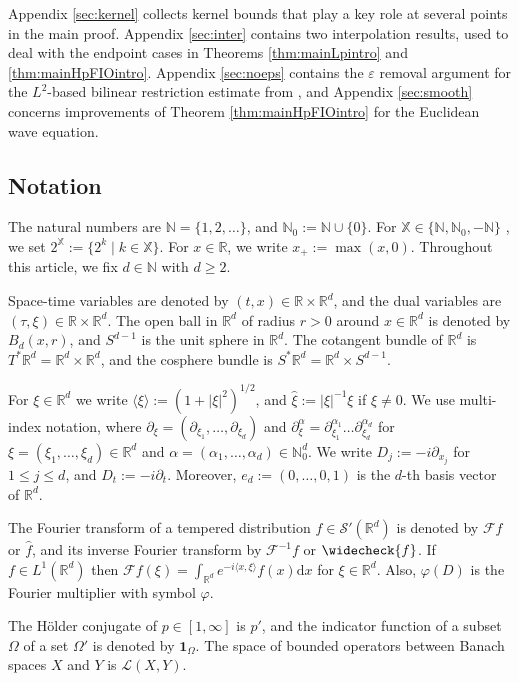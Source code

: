 \documentclass{amsart}
\numberwithin{equation}{section}
\theoremstyle{definition}
\newcommand{\R}{\mathbb{R}}
\newcommand{\Rd}{\mathbb{R}^{d}}
\newcommand{\Rn}{\mathbb{R}^{d}}
\newcommand{\N}{\mathbb{N}}
\newcommand{\Z}{\mathbb{Z}}
\newcommand{\F}{\mathcal{F}}
\newcommand {\ind}{{\mathbf{1}}}
\newcommand {\La}{\mathcal{L}}
\newcommand {\ud}{\mathrm{d}}
\newcommand {\veps}{\varepsilon}
\newcommand {\ph}{\varphi}
\newcommand {\Sp}{S^{*}\Rd}
\newcommand {\Sw}{\mathcal{S}}
\newcommand {\wh}{\widehat}
\newcommand {\rb}{\rangle}
\newcommand {\lb}{\langle}
\begin{document}
Appendix \ref{sec:kernel} collects kernel bounds that play a key role at several points in the main proof.  Appendix \ref{sec:inter} contains two interpolation results, used to deal with the endpoint cases in Theorems \ref{thm:mainLpintro} and \ref{thm:mainHpFIOintro}. Appendix \ref{sec:noeps} contains the $\veps$ removal argument for the $L^{2}$-based bilinear restriction estimate from \cite{SchippaTataru2025}, and Appendix \ref{sec:smooth} concerns improvements of Theorem \ref{thm:mainHpFIOintro} for the Euclidean wave equation.

\subsection{Notation}
The natural numbers are $\N=\{1,2,\ldots\}$, and $\N_{0}:=\N\cup\{0\}$. 
For $\mathbb{X} \in \{ \N, \N_0,-\N\}$%
, we set $2^{\mathbb{X}}:=\{2^{k}\mid k\in\mathbb{X}\}$. For $x \in \R$, we write $x_+ := \max(x,0)$. Throughout this article, we fix $d\in\N$ with $d\geq2$. 

Space-time variables are denoted by $(t,x) \in \R\times \R^d$, and the dual variables are $(\tau,\xi) \in \R\times \R^d$. The open ball in $\Rd$ of radius $r>0$ around $x\in\Rd$ is denoted by $B_{d}(x,r)$, and $S^{d-1}$ is the unit sphere in $\Rd$. The cotangent bundle of $\Rd$ is $T^{*}\Rd=\R^{d}\times\Rd$, and the cosphere bundle is $\Sp=\Rd\times S^{d-1}$.

For $\xi\in\Rd$ we write $\lb\xi\rb:=(1+|\xi|^{2})^{1/2}$, and $\hat{\xi}:=|\xi|^{-1}\xi$ if $\xi\neq 0$. We use multi-index notation, where $\partial_{\xi}=(\partial_{\xi_{1}},\ldots,\partial_{\xi_{d}})$ and 
$\partial^{\alpha}_{\xi}=\partial^{\alpha_{1}}_{\xi_{1}}\ldots\partial^{\alpha_{d}}_{\xi_{d}}$
for $\xi=(\xi_{1},\ldots,\xi_{d})\in\Rd$ and $\alpha=(\alpha_{1},\ldots,\alpha_{d})\in\N_{0}^{d}$. We write $D_j :=- i \partial_{x_j}$ for $1\leq j\leq d$, and $D_t := - i \partial_t$. Moreover, $e_{d}:=(0,\ldots,0,1)$ is the $d$-th basis vector of $\Rn$.

The Fourier transform of a tempered distribution $f\in\Sw'(\Rd)$ is denoted by $\F f$ or $\wh{f}$, and its inverse Fourier transform by $\F^{-1}f$ or 
$\widecheck{f}$. If $f\in L^{1}(\Rd)$ then $\F f(\xi)=\int_{\Rd}e^{-i\lb x,\xi\rb}f(x)\ud x$ for $\xi\in\Rd$. Also, $\ph(D)$ is the Fourier multiplier with symbol $\ph$.

The H\"{o}lder conjugate of $p\in[1,\infty]$ is $p'$, and the indicator function of a subset $\Omega$ of a set $\Omega'$ is denoted by $\ind_{\Omega}$. The space of bounded operators between Banach spaces $X$ and $Y$ is $\La(X,Y)$.
\end{document}
